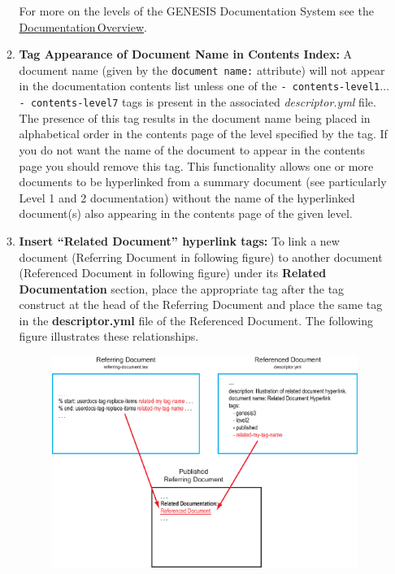 \documentclass[12pt]{article}
\begin{document}
\begin{enumerate}
\begin{enumerate}
For more on the levels of the GENESIS Documentation System see the \href{../documentation-overview/documentation-overview.tex}{Documentation\,Overview}.

\item[]{\bf Tag Appearance of Document Name in Contents Index:} A document name (given by the {\tt document\,name:} attribute) will not appear in the documentation contents list unless one of the {\tt -\,contents-level1}$\ldots${\tt -\,contents-level7} tags is present in the associated {\it descriptor.yml} file. The presence of this tag results in the document name being placed in alphabetical order in the contents page of the level specified by the tag. If you do not want the name of the document to appear in the contents page you should remove this tag. This functionality allows one or more documents to be hyperlinked from a summary document (see particularly Level 1 and 2 documentation) without the name of the hyperlinked document(s) also appearing in the contents page of the given level.

\item[]{\bf Insert ``Related Document'' hyperlink tags:} To link a new document (Referring Document in following figure) to another document (Referenced Document in following figure) under its {\bf Related Documentation} section, place the appropriate tag after the tag construct at the head of the Referring Document and place the same tag in the {\bf descriptor.yml} file of the Referenced Document. The following figure illustrates these relationships.
\begin{figure}[h]
  \centering
   \includegraphics[scale=0.8]{figures/related-document.eps}
\end{figure}


\end{enumerate}
\end{enumerate}
\end{document}
